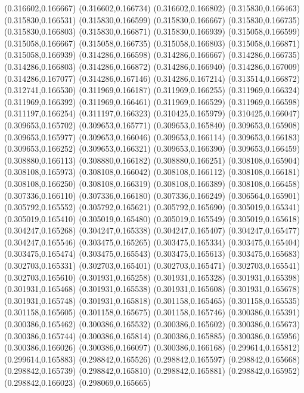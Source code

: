 (0.316602,0.166667)
(0.316602,0.166734)
(0.316602,0.166802)
(0.315830,0.166463)
(0.315830,0.166531)
(0.315830,0.166599)
(0.315830,0.166667)
(0.315830,0.166735)
(0.315830,0.166803)
(0.315830,0.166871)
(0.315830,0.166939)
(0.315058,0.166599)
(0.315058,0.166667)
(0.315058,0.166735)
(0.315058,0.166803)
(0.315058,0.166871)
(0.315058,0.166939)
(0.314286,0.166598)
(0.314286,0.166667)
(0.314286,0.166735)
(0.314286,0.166803)
(0.314286,0.166872)
(0.314286,0.166940)
(0.314286,0.167009)
(0.314286,0.167077)
(0.314286,0.167146)
(0.314286,0.167214)
(0.313514,0.166872)
(0.312741,0.166530)
(0.311969,0.166187)
(0.311969,0.166255)
(0.311969,0.166324)
(0.311969,0.166392)
(0.311969,0.166461)
(0.311969,0.166529)
(0.311969,0.166598)
(0.311197,0.166254)
(0.311197,0.166323)
(0.310425,0.165979)
(0.310425,0.166047)
(0.309653,0.165702)
(0.309653,0.165771)
(0.309653,0.165840)
(0.309653,0.165908)
(0.309653,0.165977)
(0.309653,0.166046)
(0.309653,0.166114)
(0.309653,0.166183)
(0.309653,0.166252)
(0.309653,0.166321)
(0.309653,0.166390)
(0.309653,0.166459)
(0.308880,0.166113)
(0.308880,0.166182)
(0.308880,0.166251)
(0.308108,0.165904)
(0.308108,0.165973)
(0.308108,0.166042)
(0.308108,0.166112)
(0.308108,0.166181)
(0.308108,0.166250)
(0.308108,0.166319)
(0.308108,0.166389)
(0.308108,0.166458)
(0.307336,0.166110)
(0.307336,0.166180)
(0.307336,0.166249)
(0.306564,0.165901)
(0.305792,0.165552)
(0.305792,0.165621)
(0.305792,0.165690)
(0.305019,0.165341)
(0.305019,0.165410)
(0.305019,0.165480)
(0.305019,0.165549)
(0.305019,0.165618)
(0.304247,0.165268)
(0.304247,0.165338)
(0.304247,0.165407)
(0.304247,0.165477)
(0.304247,0.165546)
(0.303475,0.165265)
(0.303475,0.165334)
(0.303475,0.165404)
(0.303475,0.165474)
(0.303475,0.165543)
(0.303475,0.165613)
(0.303475,0.165683)
(0.302703,0.165331)
(0.302703,0.165401)
(0.302703,0.165471)
(0.302703,0.165541)
(0.302703,0.165610)
(0.301931,0.165258)
(0.301931,0.165328)
(0.301931,0.165398)
(0.301931,0.165468)
(0.301931,0.165538)
(0.301931,0.165608)
(0.301931,0.165678)
(0.301931,0.165748)
(0.301931,0.165818)
(0.301158,0.165465)
(0.301158,0.165535)
(0.301158,0.165605)
(0.301158,0.165675)
(0.301158,0.165746)
(0.300386,0.165391)
(0.300386,0.165462)
(0.300386,0.165532)
(0.300386,0.165602)
(0.300386,0.165673)
(0.300386,0.165744)
(0.300386,0.165814)
(0.300386,0.165885)
(0.300386,0.165956)
(0.300386,0.166026)
(0.300386,0.166097)
(0.300386,0.166168)
(0.299614,0.165812)
(0.299614,0.165883)
(0.298842,0.165526)
(0.298842,0.165597)
(0.298842,0.165668)
(0.298842,0.165739)
(0.298842,0.165810)
(0.298842,0.165881)
(0.298842,0.165952)
(0.298842,0.166023)
(0.298069,0.165665)

